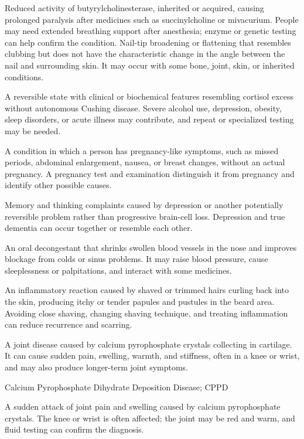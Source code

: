  Reduced activity of butyrylcholinesterase, inherited or acquired, causing prolonged paralysis after medicines such as succinylcholine or mivacurium. People may need extended breathing support after anesthesia; enzyme or genetic testing can help confirm the condition.
 Nail-tip broadening or flattening that resembles clubbing but does not have the characteristic change in the angle between the nail and surrounding skin. It may occur with some bone, joint, skin, or inherited conditions.

 A reversible state with clinical or biochemical features resembling cortisol excess without autonomous Cushing disease. Severe alcohol use, depression, obesity, sleep disorders, or acute illness may contribute, and repeat or specialized testing may be needed.

 A condition in which a person has pregnancy-like symptoms, such as missed periods, abdominal enlargement, nausea, or breast changes, without an actual pregnancy. A pregnancy test and examination distinguish it from pregnancy and identify other possible causes.

 Memory and thinking complaints caused by depression or another potentially reversible problem rather than progressive brain-cell loss. Depression and true dementia can occur together or resemble each other.

 An oral decongestant that shrinks swollen blood vessels in the nose and improves blockage from colds or sinus problems. It may raise blood pressure, cause sleeplessness or palpitations, and interact with some medicines.

 An inflammatory reaction caused by shaved or trimmed hairs curling back into the skin, producing itchy or tender papules and pustules in the beard area. Avoiding close shaving, changing shaving technique, and treating inflammation can reduce recurrence and scarring.

 A joint disease caused by calcium pyrophosphate crystals collecting in cartilage. It can cause sudden pain, swelling, warmth, and stiffness, often in a knee or wrist, and may also produce longer-term joint symptoms.

\synonyms
Calcium Pyrophosphate Dihydrate Deposition Disease; CPPD

 A sudden attack of joint pain and swelling caused by calcium pyrophosphate crystals. The knee or wrist is often affected; the joint may be red and warm, and fluid testing can confirm the diagnosis.

